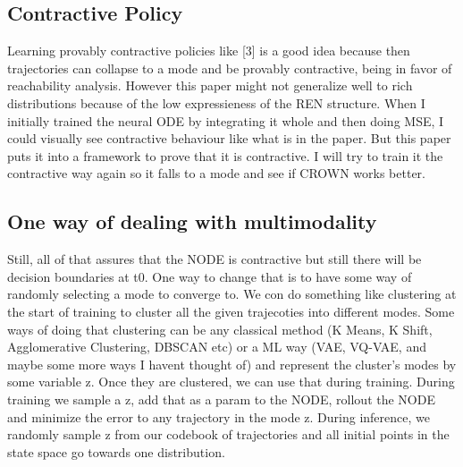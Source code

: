 \documentclass[12pt]{article}
\begin{document}
\subsection{Contractive Policy}
Learning provably contractive policies like [3] is a good idea because then trajectories can collapse to a mode and be provably contractive, being in favor of reachability analysis. 
However this paper might not generalize well to rich distributions because of the low expressieness of the REN structure. When I initially trained the neural ODE by integrating it whole and then doing MSE, I could visually see contractive behaviour like what is in the paper.
But this paper puts it into a framework to prove that it is contractive. I will try to train it the contractive way again so it falls to a mode and see if CROWN works better. 

\subsection{One way of dealing with multimodality}
Still, all of that assures that the NODE is contractive but still there will be decision boundaries at t0. One way to change that is to have some way of randomly selecting a mode to converge to. We con do something like clustering at the start of training to cluster all the given trajecoties into different modes.
Some ways of doing that clustering can be any classical method (K Means, K Shift, Agglomerative Clustering, DBSCAN etc) or a ML way (VAE, VQ-VAE, and maybe some more ways I havent thought of) and represent the cluster's modes by some variable z. Once they are clustered, we can use that during training. During training we 
sample a z, add that as a param to the NODE, rollout the NODE and minimize the error to any trajectory in the mode z. During inference, we randomly sample z from our codebook of trajectories and all initial points in the state space go towards one distribution.
\end{document}
